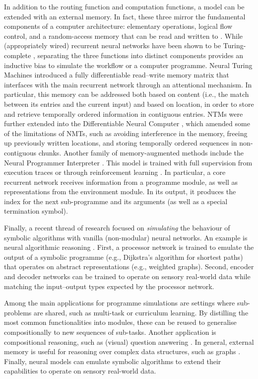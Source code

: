 \documentclass[10pt]{article} %
\begin{document}
In addition to the routing function and computation functions, a model can be extended with an external memory. In fact, these three mirror the fundamental components of a computer architecture: elementary operations, logical flow control, and a random-access memory that can be read and written to \citep{von1945first,graves2014neural}. While (appropriately wired) recurrent neural networks have been shown to be Turing-complete \citep{sontag1995computational}, separating the three functions into distinct components provides an inductive bias to simulate the workflow or a computer programme. Neural Turing Machines \citep[NTMs;][]{graves2014neural} introduced a fully differentiable read--write memory matrix that interfaces with the main recurrent network through an attentional mechanism. In particular, this memory can be addressed both based on content (i.e., the match between its entries and the current input) and based on location, in order to store and retrieve temporally ordered information in contiguous entries. NTMs were further extended into the Differentiable Neural Computer \citep[DNCs;][ \cref{fig:purpose_modularity:programme}]{graves2016hybrid}, which amended some of the limitations of NMTs, such as avoiding interference in the memory, freeing up previously written locations, and storing temporally ordered sequences in non-contiguous chunks. Another family of memory-augmented methods include the Neural Programmer Interpreter \citep[NPI;][]{Reed2016npi}. This model is trained with full supervision from execution traces or through reinforcement learning \citep{Pierrot2019alphanpi}. In particular, a core recurrent network receives information from a programme module, as well as representations from the environment module. In its output, it produces the index for the next sub-programme and its arguments (as well as a special termination symbol).

Finally, a recent thread of research focused on \textit{simulating} the behaviour of symbolic algorithms with vanilla (non-modular) neural networks. An example is neural algorithmic reasoning \citep{velivckovic2021neural}. First, a processor network is trained to emulate the output of a symbolic programme (e.g., Dijkstra's algorithm for shortest paths) that operates on abstract representations (e.g., weighted graphs). Second, encoder and decoder networks can be trained to operate on sensory real-world data while matching the input--output types expected by the processor network.

Among the main applications for programme simulations are settings where sub-problems are shared, such as multi-task or curriculum learning. By distilling the most common functionalities into modules, these can be reused to generalise compositionally to new sequences of sub-tasks. Another application is compositional reasoning, such as (visual) question answering \citep{andreas2016nmn,andreas2016learning}. In general, external memory is useful for reasoning over complex data structures, such as graphs \citep{graves2014neural,graves2016hybrid,Reed2016npi}. Finally, neural models can emulate symbolic algorithms to extend their capabilities to operate on sensory real-world data.
\end{document}
